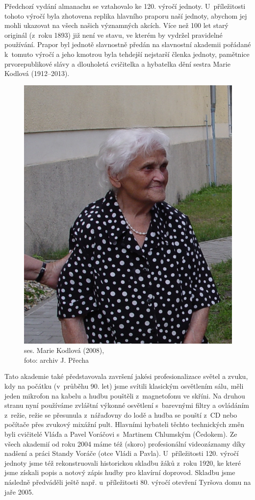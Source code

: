\documentclass[a5paper, 11pt, twoside]{article}
\begin{document}
Předchozí vydání almanachu se vztahovalo ke 120. výročí jednoty. U~příležitosti tohoto výročí byla zhotovena replika hlavního praporu naší
jednoty, abychom jej mohli ukazovat na všech našich významných akcích.
Více než 100 let starý originál (z~roku 1893) již není ve stavu, ve
kterém by vydržel pravidelné používání. Prapor byl jednotě slavnostně
předán na slavnostní akademii pořádané k~tomuto výročí a jeho kmotrou
byla tehdejší nejstarší členka jednoty, pamětnice prvorepublikové slávy
a dlouholetá cvičitelka a hybatelka dění sestra Marie Kodlová
(1912--2013). 
\begin{figure}
  \includegraphics[width=0.9\linewidth]{img/50_manka.jpg}
  \caption*{ses. Marie Kodlová (2008),\\foto: archiv J. Přecha}
\end{figure}
Tato akademie také představovala završení jakési profesionalizace světel a zvuku, kdy na počátku (v~průběhu 90. let) jsme
svítili klasickým osvětlením sálu, měli jeden mikrofon na kabelu a hudbu
pouštěli z~magnetofonu ve skříni. Na druhou stranu nyní používáme
zvláštní výkonné osvětlení s~barevnými filtry a ovládáním z~režie, režie
se přesunula z~nářaďovny do lodě a hudba se pouští z~CD nebo počítače
přes zvukový mixážní pult. Hlavními hybateli těchto technických změn
byli cvičitelé Vláďa a Pavel Voráčovi s~Martinem Chlumským (Čedokem). Ze
všech akademií od roku 2004 máme též (skoro) profesionální videozáznamy
díky nadšení a práci Standy Voráče (otce Vládi a Pavla). U~příležitosti %
120. výročí jednoty jsme též rekonstruovali historickou skladbu žáků
z~roku 1920, ke které jsme získali popis a notový zápis hudby pro klavírní
doprovod. Skladbu jsme následně předváděli ještě např. u~příležitosti
80. výročí otevření Tyršova domu na jaře 2005.
\end{document}
